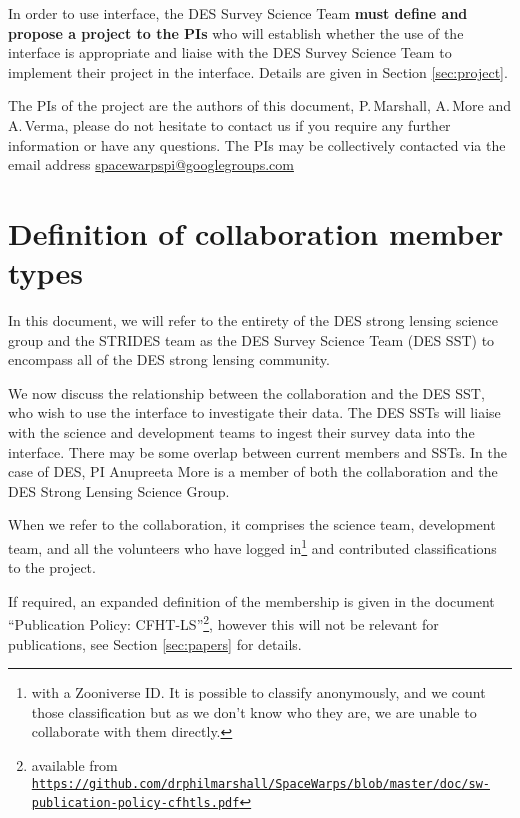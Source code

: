 \documentclass[a4paper,twocolumn]{article}
\begin{document}
In order to use \SW interface, the DES Survey Science Team \textbf{must define and propose a project to the \SW PIs} who will establish whether the use of the \SW interface is appropriate and liaise with the DES Survey Science Team to implement their project in the \SW interface. Details are given in  Section \ref{sec:project}.

\vspace{2mm}
The PIs of the \SW project are the authors of this document, P.\,Marshall, 
A.\,More and A.\,Verma, please do not hesitate to contact us if you require any further information or have any questions. The PIs may be collectively contacted via the email address \href{mailto:spacewarpspi@googlegroups.com}{spacewarpspi@googlegroups.com}




\section{Definition of collaboration member types}
\label{sec:members}

In this document, we will refer to the entirety of the DES strong lensing science group and the STRIDES team as the DES Survey Science Team (DES SST) to encompass all of the DES strong lensing community.

We now discuss the relationship between the \SW collaboration and the DES SST, who wish to use the \SW interface to investigate their data. The DES SSTs will liaise with the \SW science and development teams to ingest their survey data into the \SW interface. There may be some overlap between current \SW members and SSTs. In the case of DES, \SW PI Anupreeta More is a member of both the \SW collaboration and the DES Strong Lensing Science Group.

When we refer to the \SW collaboration, it comprises the \SW science team, \SW development team, and all the volunteers who have 
logged in\footnote{with a Zooniverse ID. It is possible to classify anonymously, and we count those classification but as we don't know who they are, we are unable to collaborate with them directly.} and contributed classifications to the project. 

If required, an expanded definition of the \SW membership is given in the document ``\SW Publication Policy: CFHT-LS''\footnote{available from \texttt{\url{https://github.com/drphilmarshall/SpaceWarps/blob/master/doc/sw-publication-policy-cfhtls.pdf}}}, however this will not be relevant for publications, see Section \ref{sec:papers} for details.
\end{document}
